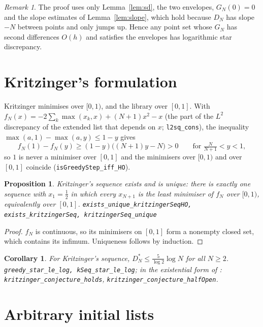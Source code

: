 \documentclass[11pt]{amsart}
\newtheorem{proposition}[theorem]{Proposition}
\newtheorem{corollary}[theorem]{Corollary}
\theoremstyle{remark}
\newtheorem{remark}[theorem]{Remark}
\newcommand{\lean}[1]{\texttt{\small #1}}
\begin{document}
\begin{remark}
The proof uses only Lemma~\ref{lem:sd}, the two envelopes, $G_N(0)=0$ and the
slope estimates of Lemma~\ref{lem:slope}, which hold because $D_N$ has slope $-N$
between points and only jumps up. Hence any point set whose $G_N$ has second
differences $O(h)$ and satisfies the envelopes has logarithmic star discrepancy.
\end{remark}

\section{Kritzinger's formulation}\label{sec:kri}

Kritzinger minimises over $[0,1)$, and the library over $[0,1]$. With
$f_N(x)=-2\sum_k\max(x_k,x)+(N+1)x^2-x$ (the part of the $L^2$ discrepancy of the
extended list that depends on $x$; \lean{l2sq\_cons}), the inequality
$\max(a,1)-\max(a,y)\le1-y$ gives
\[
f_N(1)-f_N(y)\ge(1-y)\bigl((N+1)y-N\bigr)>0\qquad\text{for }\tfrac N{N+1}<y<1 ,
\]
so $1$ is never a minimiser over $[0,1]$ and the minimisers over $[0,1)$ and over
$[0,1]$ coincide (\lean{isGreedyStep\_iff\_HO}).

\begin{proposition}\label{prop:exist}
Kritzinger's sequence exists and is unique: there is exactly one sequence with
$x_1=\frac12$ in which every $x_{N+1}$ is the least minimiser of $f_N$ over
$[0,1)$, equivalently over $[0,1]$.
\lean{exists\_unique\_kritzingerSeqHO, exists\_kritzingerSeq, kritzingerSeq\_unique}
\end{proposition}

\begin{proof}
$f_N$ is continuous, so its minimisers on $[0,1]$ form a nonempty closed set, which
contains its infimum. Uniqueness follows by induction.
\end{proof}

\begin{corollary}\label{cor:kri}
For Kritzinger's sequence, $D_N^*\le\frac5{\log2}\log N$ for all $N\ge2$.
\lean{greedy\_star\_le\_log, kSeq\_star\_le\_log}; in the existential form of
\cite[Conjecture 2]{Kri}: \lean{kritzinger\_conjecture\_holds},
\lean{kritzinger\_conjecture\_halfOpen}.
\end{corollary}

\section{Arbitrary initial lists}\label{sec:from}
\end{document}
